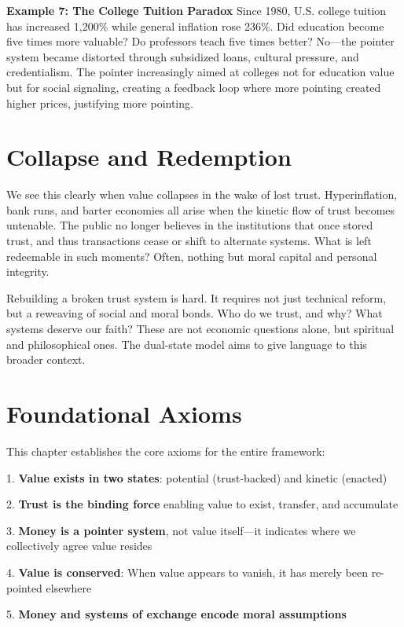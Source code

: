 \documentclass[11pt,oneside]{book}
\begin{document}
\textbf{Example 7: The College Tuition Paradox}
Since 1980, U.S. college tuition has increased 1,200\% while general inflation rose 236\%. Did education become five times more valuable? Do professors teach five times better? No—the pointer system became distorted through subsidized loans, cultural pressure, and credentialism. The pointer increasingly aimed at colleges not for education value but for social signaling, creating a feedback loop where more pointing created higher prices, justifying more pointing.

\section{Collapse and Redemption}

We see this clearly when value collapses in the wake of lost trust. Hyperinflation, bank runs, and barter economies all arise when the kinetic flow of trust becomes untenable. The public no longer believes in the institutions that once stored trust, and thus transactions cease or shift to alternate systems. What is left redeemable in such moments? Often, nothing but moral capital and personal integrity.

Rebuilding a broken trust system is hard. It requires not just technical reform, but a reweaving of social and moral bonds. Who do we trust, and why? What systems deserve our faith? These are not economic questions alone, but spiritual and philosophical ones. The dual-state model aims to give language to this broader context.

\section{Foundational Axioms}

This chapter establishes the core axioms for the entire framework:


1. \textbf{Value exists in two states}: potential (trust-backed) and kinetic (enacted)


2. \textbf{Trust is the binding force} enabling value to exist, transfer, and accumulate


3. \textbf{Money is a pointer system}, not value itself—it indicates where we collectively agree value resides


4. \textbf{Value is conserved}: When value appears to vanish, it has merely been re-pointed elsewhere


5. \textbf{Money and systems of exchange encode moral assumptions}
\end{document}
